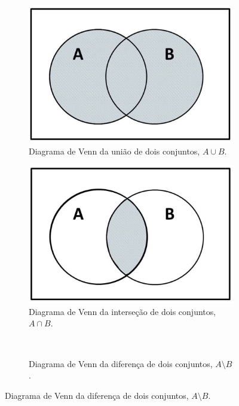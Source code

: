 \documentclass[fleqn]{profmat-cefet}
\begin{document}
\begin{figure}
    \centering
    \caption{Exemplo de uma figura com sub-figuras.}
    \label{fig:equilibrium}
    \begin{subfigure}[t]{0.4\linewidth}
        \centering
        \caption{Diagrama de Venn da união de dois conjuntos, $A\cup B$.}
        \label{fig:conjuntos_uniao}
            \includegraphics[width=.9\linewidth]{figs/conjuntos-uniao}
    \end{subfigure}%
    \hspace{1cm}
    \begin{subfigure}[t]{0.4\linewidth}
        \centering
        \caption{Diagrama de Venn da interseção de dois conjuntos, $A\cap B$.}
        \label{fig:conjuntos_intersecao}
            \includegraphics[width=.9\linewidth]{figs/conjuntos-intersecao}
    \end{subfigure}%
    \\[3mm]
    \begin{subfigure}[t]{0.4\linewidth}
        \centering
        \caption{Diagrama de Venn da diferença de dois conjuntos, $A\setminus B$.}

\end{subfigure}
\end{figure}
\end{document}
